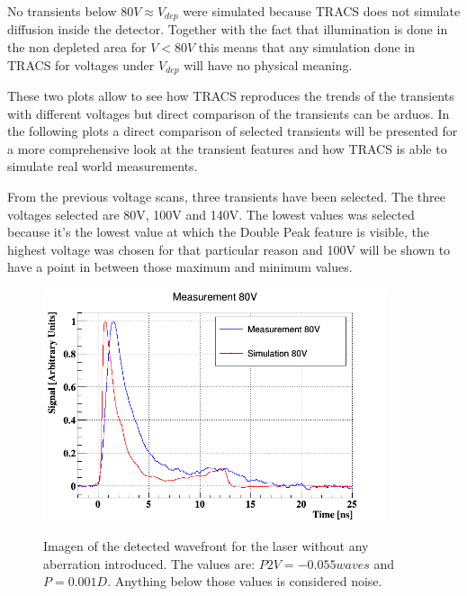 No transients below $80V \approx V_{dep}$ were simulated because TRACS does not simulate diffusion inside the detector. Together with the fact that illumination is done in the non depleted area for $V < 80V$ this means that any simulation done in TRACS for voltages under $V_{dep}$ will have no physical meaning.

These two plots allow to see how TRACS reproduces the trends of the transients with different voltages but direct comparison of the transients can be arduos. In the following plots a direct comparison of selected transients will be presented for a more comprehensive look at the transient features and how TRACS is able to simulate real world measurements.

From the previous voltage scans, three transients have been selected. The three voltages selected are 80V, 100V and 140V. The lowest values was selected because it's the lowest value at which the Double Peak feature is visible, the highest voltage was chosen for that particular reason and 100V will be shown to have a point in between those maximum and minimum values.

\begin{figure}[H]
	\centering
	\includegraphics[width=0.9\textwidth]{80V.png}
	\label{fig:mues2}
	\caption{Imagen of the detected wavefront for the laser without any aberration introduced. The values are: $P2V = -0.055waves$ and $P = 0.001D$. Anything below those values is considered noise.}
\end{figure}

